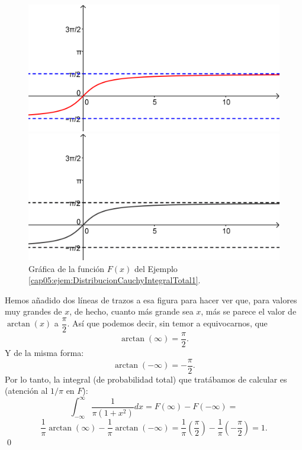 \begin{ejemplo}
\begin{figure}[htbp]
\begin{center}
\begin{enColor}
\includegraphics[width=12cm]{../fig/Cap05-GraficaArcoTangente.png}
\end{enColor}
\begin{bn}
\includegraphics[width=12cm]{../fig/Cap05-GraficaArcoTangente-bn.png}
\end{bn}
\caption{Gráfica de la función $F(x)$ del Ejemplo \ref{cap05:ejem:DistribucionCauchyIntegralTotal1}.}
\label{cap05:fig:Cap05-GraficaArcoTangente}
\end{center}
\end{figure}

    Hemos añadido dos líneas de trazos a esa figura para hacer ver que, para valores muy grandes de $x$, de hecho, cuanto más grande sea $x$, más se parece el valor de $\arctan(x)$ a $\dfrac{\pi}{2}$. Así que podemos decir, sin temor a equivocarnos, que
    \[\arctan(\infty)=\dfrac{\pi}{2}.\]
    Y de la misma forma:
    \[\arctan(-\infty)=-\dfrac{\pi}{2}.\]
    Por lo tanto, la integral (de probabilidad total) que tratábamos de calcular es (atención al $1/\pi$ en $F$):
    \[\int_{-\infty}^{\infty}\dfrac{1}{\pi(1+x^2)}dx=F(\infty)-F(-\infty)=\]
    \[\dfrac{1}{\pi}\arctan(\infty)-\dfrac{1}{\pi}\arctan(-\infty)=
    \dfrac{1}{\pi}\left(\dfrac{\pi}{2}\right)-\dfrac{1}{\pi}\left(-\dfrac{\pi}{2}\right)=1.\]
    \qed
\end{ejemplo}

